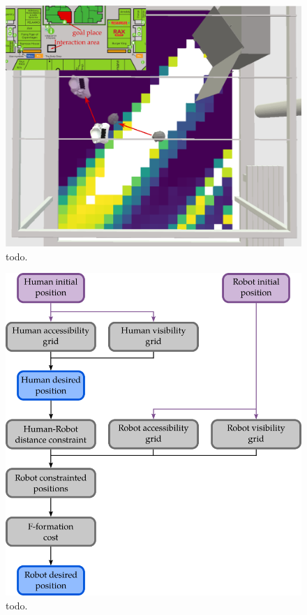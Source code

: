 \begin{figure}[ht!]
\centering
\includegraphics[scale=0.25]{figures/chapter8/grid_map.png}
\caption{\label{fig:chap8_svp_grid} todo. }
\end{figure}

\begin{figure}[ht!]
\centering
\includegraphics[scale=0.45]{figures/chapter8/svp.png}
\caption{\label{fig:chap8_svp} todo. }
\end{figure}

